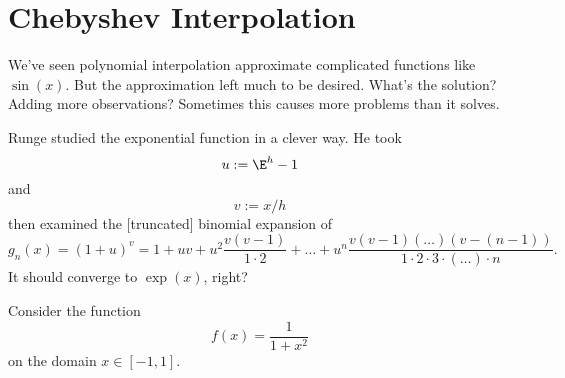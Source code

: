 \section{Chebyshev Interpolation}

We've seen polynomial interpolation approximate complicated functions
like $\sin(x)$. But the approximation left much to be desired. What's
the solution? Adding more observations? Sometimes this causes more
problems than it solves.

\begin{ex}
  Runge studied the exponential function in a clever way. He took
  \begin{equation}
    u := \E^{h}-1
  \end{equation}
  and
  \begin{equation}
    v := x/h
  \end{equation}
  then examined the [truncated] binomial expansion of
  \begin{equation}
    g_{n}(x) = (1 + u)^{v} = 1 + uv + u^{2}\frac{v(v-1)}{1\cdot 2}
    +\dots+u^{n}\frac{v(v-1)(\dots)(v-(n-1))}{1\cdot2\cdot3\cdot(\dots)\cdot n}.
  \end{equation}
  It should converge to $\exp(x)$, right?
  
  Consider the function
  \begin{equation}
    f(x) = \frac{1}{1 + x^{2}}
  \end{equation}
  on the domain $x\in[-1,1]$.
\end{ex}